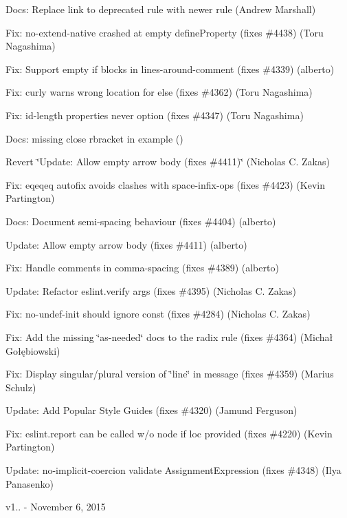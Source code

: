 \begin{DoxyItemize}
\item Docs\+: Replace link to deprecated rule with newer rule (Andrew Marshall)
\item Fix\+: {\ttfamily no-\/extend-\/native} crashed at empty define\+Property (fixes \#4438) (Toru Nagashima)
\item Fix\+: Support empty if blocks in lines-\/around-\/comment (fixes \#4339) (alberto)
\item Fix\+: {\ttfamily curly} warns wrong location for {\ttfamily else} (fixes \#4362) (Toru Nagashima)
\item Fix\+: {\ttfamily id-\/length} properties never option (fixes \#4347) (Toru Nagashima)
\item Docs\+: missing close rbracket in example ()
\item Revert \char`\"{}\+Update\+: Allow empty arrow body (fixes \#4411)\char`\"{} (Nicholas C. Zakas)
\item Fix\+: eqeqeq autofix avoids clashes with space-\/infix-\/ops (fixes \#4423) (Kevin Partington)
\item Docs\+: Document semi-\/spacing behaviour (fixes \#4404) (alberto)
\item Update\+: Allow empty arrow body (fixes \#4411) (alberto)
\item Fix\+: Handle comments in comma-\/spacing (fixes \#4389) (alberto)
\item Update\+: Refactor eslint.\+verify args (fixes \#4395) (Nicholas C. Zakas)
\item Fix\+: no-\/undef-\/init should ignore const (fixes \#4284) (Nicholas C. Zakas)
\item Fix\+: Add the missing \char`\"{}as-\/needed\char`\"{} docs to the radix rule (fixes \#4364) (Michał Gołębiowski)
\item Fix\+: Display singular/plural version of \char`\"{}line\char`\"{} in message (fixes \#4359) (Marius Schulz)
\item Update\+: Add Popular Style Guides (fixes \#4320) (Jamund Ferguson)
\item Fix\+: eslint.\+report can be called w/o node if loc provided (fixes \#4220) (Kevin Partington)
\item Update\+: no-\/implicit-\/coercion validate Assignment\+Expression (fixes \#4348) (Ilya Panasenko)
\end{DoxyItemize}

v1.. -\/ November 6, 2015



